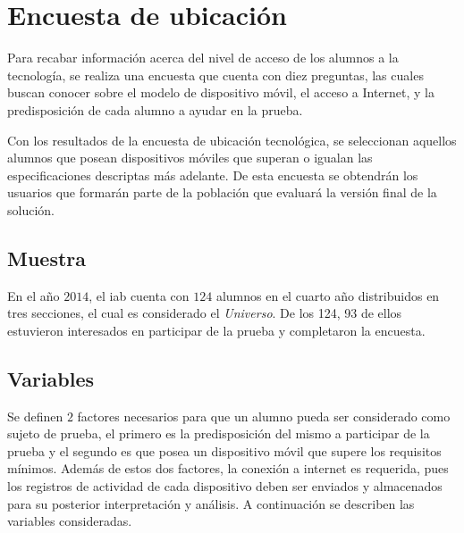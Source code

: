 
\section{Encuesta de ubicación}
\label{sec:ubicacion}

Para recabar información acerca del nivel de acceso  de los alumnos a la
tecnología, se realiza una encuesta que cuenta con diez preguntas, las cuales
buscan conocer sobre el modelo de dispositivo móvil, el acceso a
Internet, y la predisposición de cada alumno a ayudar en la prueba.

Con los resultados de la encuesta de ubicación tecnológica, se seleccionan
aquellos alumnos que posean dispositivos móviles que superan o igualan las
especificaciones descriptas más adelante. De esta encuesta se obtendrán los 
usuarios que formarán parte de la población que evaluará la versión final de 
la solución.

\subsection{Muestra}

En el año $2014$, el \Gls{iab} cuenta con $124$ alumnos en el cuarto año distribuidos en
tres secciones, el cual es considerado el \emph{Universo}. De los 124, 93 de
ellos estuvieron interesados en participar de la prueba y completaron la encuesta.

\subsection{Variables}

Se definen $2$ factores necesarios para que un alumno pueda ser considerado como
sujeto de prueba, el primero es la predisposición del mismo a participar de la
prueba y el segundo es que posea un dispositivo móvil que supere los requisitos
mínimos. Además de estos dos factores, la conexión a internet es requerida, pues 
los registros de actividad de cada dispositivo deben ser enviados y almacenados 
para su posterior interpretación y análisis. A continuación se describen las variables 
consideradas.

